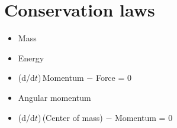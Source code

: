 \chapter{Conservation laws}

\begin{itemize}
    \item Mass
    \item Energy
    \item (d/d$t$)\,Momentum $-$ Force = 0
    \item Angular momentum
    \item (d/d$t$)\,(Center of mass) $-$ Momentum = 0
\end{itemize}